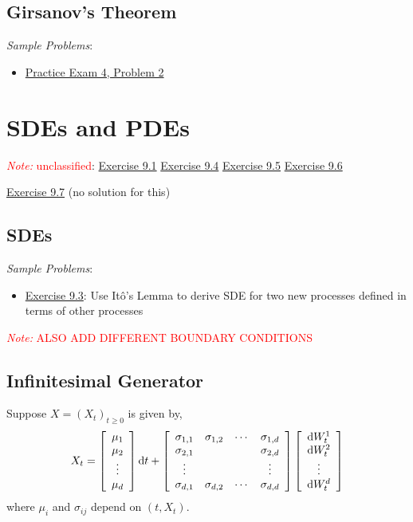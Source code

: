 \documentclass[12pt]{article}
\newcommand{\note}[1]{\textcolor{red}{\textit{Note:} #1}}
\begin{document}
\subsection{Girsanov's Theorem}

\textit{Sample Problems}:
\begin{itemize}[nolistsep]
    \item \hyperref[Practice Exam 4, Problem 2]{Practice Exam 4, Problem 2}
\end{itemize}


\pagebreak
\section{SDEs and PDEs}
\note{unclassified}:
\hyperref[Exercise 9.4]{Exercise 9.1}
\hyperref[Exercise 9.4]{Exercise 9.4}
\hyperref[Exercise 9.5]{Exercise 9.5}
\hyperref[Exercise 9.6]{Exercise 9.6}

\hyperref[Exercise 9.7]{Exercise 9.7} (no solution for this)


\subsection{SDEs}

\textit{Sample Problems}:
\begin{itemize}[nolistsep]
    \item \hyperref[Exercise 9.3]{Exercise 9.3}: Use It\^o's Lemma to derive SDE for two new processes defined in terms of other processes
\end{itemize}



\note{ALSO ADD DIFFERENT BOUNDARY CONDITIONS}

\subsection{Infinitesimal Generator}
\label{sec:infgen}
Suppose \( X = (X_t)_{t\geq 0} \) is given by,
\begin{align*}
    X_t = \left[\begin{array}{c}\mu_1 \\ \mu_2 \\ \vdots \\ \mu_d \end{array}\right] \mathrm{d} t + \left[\begin{array}{cccc}\sigma_{1,1} & \sigma_{1,2} & \cdots & \sigma_{1,d} \\
        \sigma_{2,1} & & & \sigma_{2,d} \\
        \vdots & & & \vdots \\
        \sigma_{d,1} & \sigma_{d,2} & \cdots & \sigma_{d,d}
\end{array}\right]
\left[\begin{array}{c}\mathrm{d} W_t^1 \\ \mathrm{d} W_t^2 \\ \vdots \\ \mathrm{d} W_t^d\end{array}\right]
\end{align*}
where \( \mu_i \) and \( \sigma_{ij} \) depend on \( (t,X_t) \).
\end{document}
